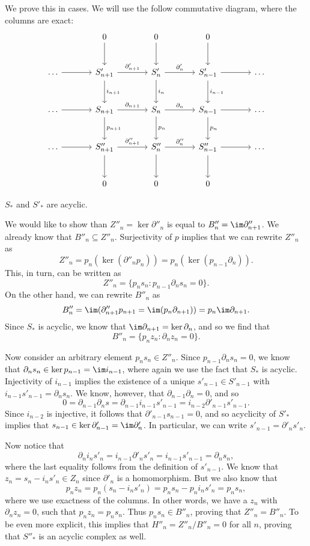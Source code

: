 \documentclass[../../solutions.tex]{subfiles}
\begin{document}
\begin{exercise} \leavevmode
We prove this in cases. We will use the follow commutative diagram, where the columns are exact: 
\[\begin{tikzcd}[row sep=large,column sep=large]
& 0\ar[d] & 0\ar[d] & 0\ar[d] & \\ 
\dots\ar[r] & S'_{n+1} \ar[r,"\partial'_{n+1}"] \ar[d,"i_{n+1}"] & S'_n \ar[r,"\partial'_n"] \ar[d,"i_n"] & S'_{n-1}\ar[r] \ar[d,"i_{n-1}"] & \dots \\ 
\dots\ar[r] & S_{n+1} \ar[r,"\partial_{n+1}"] \ar[d,"p_{n+1}"] & S_n \ar[r,"\partial_n"] \ar[d,"p_n"] & S_{n-1}\ar[r] \ar[d,"p_n"] & \dots \\ 
\dots\ar[r] & S''_{n+1} \ar[r,"\partial''_{n+1}"] \ar[d] & S''_n \ar[r,"\partial''_n"] \ar[d] & S''_{n-1}\ar[r] \ar[d] & \dots \\ 
& 0 & 0 & 0 & 
\end{tikzcd}\]

\begin{case}
$S_*$ and $S'_*$ are acyclic. 
\end{case}
We would like to show than $Z''_n=\ker\partial''_n$ is equal to $B''_n=\im\partial''_{n+1}$. 
We already know that $B''_n\subseteq Z''_n$. 
Surjectivity of $p$ implies that we can rewrite $Z''_n$ as \[Z''_n=p_n(\ker(\partial''_np_n))=p_n(\ker(p_{n-1}\partial_n)).\] 
This, in turn, can be written as \[Z''_n=\{p_ns_n:p_{n-1}\partial_ns_n=0\}.\]
On the other hand, we can rewrite $B''_n$ as \[B''_n=\im(\partial''_{n+1}p_{n+1}=\im(p_n\partial_{n+1}))=p_n\im\partial_{n+1}.\]
Since $S_*$ is acyclic, we know that $\im\partial_{n+1}=\ker\partial_n$, and so we find that \[B''_n=\{p_nz_n:\partial_nz_n=0\}.\]

Now consider an arbitrary element $p_ns_n\in Z''_n$. 
Since $p_{n-1}\partial_ns_n=0$, we know that $\partial_ns_n\in\ker p_{n-1}=\im i_{n-1}$, where again we use the fact that $S_*$ is acyclic. 
Injectivity of $i_{n-1}$ implies the existence of a unique $s'_{n-1}\in S'_{n-1}$ with $i_{n-1}s'_{n-1}=\partial_ns_n$. 
We know, however, that $\partial_{n-1}\partial_n=0$, and so \[0=\partial_{n-1}\partial_ns=\partial_{n-1}i_{n-1}s'_{n-1}=i_{n-2}\partial'_{n-1}s'_{n-1}.\]
Since $i_{n-2}$ is injective, it follows that $\partial'_{n-1}s_{n-1}=0$, and so acyclicity of $S'_*$ implies that $s_{n-1}\in\ker\partial'_{n-1}=\im\partial'_n$. 
In particular, we can write $s'_{n-1}=\partial'_ns'_n$. 

Now notice that \[\partial_ni_ns'_n=i_{n-1}\partial'_ns'_n=i_{n-1}s'_{n-1}=\partial_ns_n,\] where the last equality follows from the definition of $s'_{n-1}$. 
We know that $z_n=s_n-i_ns'_n\in Z_n$ since $\partial'_n$ is a homomorphism. 
But we also know that \[p_nz_n=p_n(s_n-i_ns'_n)=p_ns_n-p_ni_ns'_n=p_ns_n,\] where we use exactness of the columns. 
In other words, we have a $z_n$ with $\partial_nz_n=0$, such that $p_nz_n=p_ns_n$. 
Thus $p_ns_n\in B''_n$, proving that $Z''_n=B''_n$. 
To be even more explicit, this implies that $H''_n=Z''_n/B''_n=0$ for all $n$, proving that $S''_*$ is an acyclic complex as well. 


\end{exercise}
\end{document}
